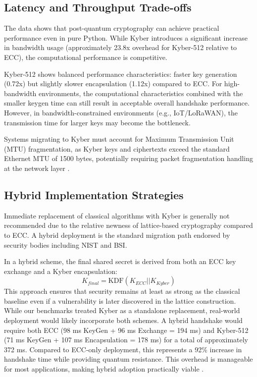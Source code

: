 \subsection{Latency and Throughput Trade-offs}

The data shows that post-quantum cryptography can achieve practical performance even in pure Python. While Kyber introduces a significant increase in bandwidth usage (approximately 23.8x overhead for Kyber-512 relative to ECC), the computational performance is competitive.

Kyber-512 shows balanced performance characteristics: faster key generation (0.72x) but slightly slower encapsulation (1.12x) compared to ECC. For high-bandwidth environments, the computational characteristics combined with the smaller keygen time can still result in acceptable overall handshake performance. However, in bandwidth-constrained environments (e.g., IoT/LoRaWAN), the transmission time for larger keys may become the bottleneck.

Systems migrating to Kyber must account for Maximum Transmission Unit (MTU) fragmentation, as Kyber keys and ciphertexts exceed the standard Ethernet MTU of 1500 bytes, potentially requiring packet fragmentation handling at the network layer \cite{Paquin2020}.

\subsection{Hybrid Implementation Strategies}

Immediate replacement of classical algorithms with Kyber is generally not recommended due to the relative newness of lattice-based cryptography compared to ECC. A hybrid deployment is the standard migration path endorsed by security bodies including NIST and BSI.

In a hybrid scheme, the final shared secret is derived from both an ECC key exchange and a Kyber encapsulation:
\[ K_{final} = \text{KDF}(K_{ECC} || K_{Kyber}) \]
This approach ensures that security remains at least as strong as the classical baseline even if a vulnerability is later discovered in the lattice construction. While our benchmarks treated Kyber as a standalone replacement, real-world deployment would likely incorporate both schemes. A hybrid handshake would require both ECC (98 ms KeyGen + 96 ms Exchange = 194 ms) and Kyber-512 (71 ms KeyGen + 107 ms Encapsulation = 178 ms) for a total of approximately 372 ms. Compared to ECC-only deployment, this represents a 92\% increase in handshake time while providing quantum resistance. This overhead is manageable for most applications, making hybrid adoption practically viable \cite{Bernstein2017,Paquin2020}.

